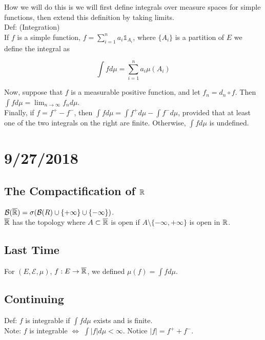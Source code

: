 \documentclass[english, 11pt]{article}
\begin{document}
How we will do this is we will first define integrals over measure spaces for simple functions, then extend this definition by taking limits.\\

Def: (Integration)\\

If $f$ is a simple function, $f = \sum_{i = 1}^n a_i \mathbb{1}_{A_i}$, where $\{A_i\}$ is a partition of $E$ we define the integral as

\[\int f d\mu = \sum_{i=1}^n a_i \mu(A_i)\]

Now, suppose that $f$ is a measurable positive function, and let $f_n = d_n \circ f$. Then $\int f d\mu = \lim_{n \to \infty} f_n d\mu$.\\

Finally, if $f = f^+ - f^-$, then $\int f d\mu = \int f^+ d\mu - \int f^- d\mu$, provided that at least one of the two integrals on the right are finite. Otherwise, $\int f d\mu$ is undefined.

\section{9/27/2018}

\subsection{The Compactification of ${\mathbb{R}}$}

$\mathcal{B}(\overline{{\mathbb{R}}}) = \sigma(\mathcal{B}(R) \cup \{+ \infty\} \cup \{-\infty\})$.\\

$\overline{{\mathbb{R}}}$ has the topology where $A \subset \overline{{\mathbb{R}}}$ is open if $A \setminus \{-\infty, +\infty\}$ is open in ${\mathbb{R}}$.\\

\subsection{Last Time}
For $(E, \mathcal{E}, \mu)$, $f: E \to \overline{{\mathbb{R}}}$, we defined $\mu(f) = \int f d\mu$.

\subsection{Continuing}
Def: $f$ is integrable if $\int f d\mu$ exists and is finite.\\

Note: $f$ is integrable $\iff$ $\int |f| d\mu < \infty$. Notice $|f| = f^+ + f^-$.\\
\end{document}
